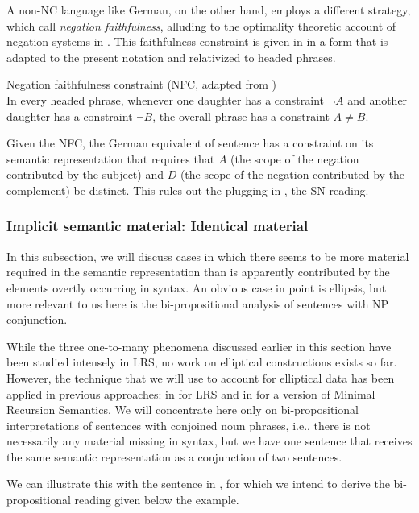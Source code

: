 \documentclass[output=paper]{langsci/langscibook}
\begin{document}
A non-NC language like German, on the other hand, employs a different strategy, which \citet{Richter:Sailer:06} call \emph{negation faithfulness}, alluding to the optimality theoretic account of negation systems in \citet{deSwart:10}. This faithfulness constraint is given in  in a form that is adapted to the present notation and relativized to headed phrases.

\ea \label{neg-faith}
Negation faithfulness constraint (NFC, adapted from \citealt{Richter:Sailer:06})\\
In every headed phrase, whenever one daughter has a constraint $\lnot A$ and another daughter has a constraint $\lnot B$, the overall phrase has a constraint $A \not= B$.
\z

Given the NFC, the German equivalent of sentence  has a constraint on its semantic representation that requires that $A$ (the scope of the negation contributed by the subject) and $D$ (the scope of the negation contributed by the complement) be distinct. This rules out the plugging in , the SN reading.

\subsubsection{Implicit semantic material: Identical material}
\label{Sec-ImplicitSemMat}

In this subsection, we will discuss cases in which there seems to be more material required in the semantic representation than is apparently contributed by the elements overtly occurring in syntax. An obvious case in point is ellipsis, but more relevant to us here is the bi-propositional analysis of sentences with NP conjunction.

While the three one-to-many phenomena discussed earlier in this section have been studied intensely in LRS, no work on elliptical constructions exists so far.
However, the technique that we will use to account for elliptical data has been applied in previous approaches: in \citet{Sailer:05.hpsg} for LRS and in \citet{Bonami:Godard:07} for a version of Minimal Recursion Semantics.
We will concentrate here only on bi-propositional interpretations of sentences with conjoined noun phrases, i.e., there is not necessarily any material missing in syntax, but we have one sentence that receives the same semantic representation as a conjunction of two sentences.

We can illustrate this with the sentence in , for which we intend to derive the bi-propositional reading given below the example.
\end{document}
